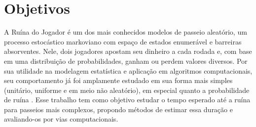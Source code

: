\documentclass[a4paper,10pt,twocolumn]{article}
\begin{document}
\pagestyle{fancy}
\fancyhead{}
\renewcommand{\headrulewidth}{0pt}


\section{Objetivos}

A Ruína do Jogador é um dos mais conhecidos modelos de passeio aleatório, um
processo estocástico markoviano com espaço de estados enumerável e barreiras
absorventes. Nele, dois jogadores apostam seu dinheiro a cada rodada e, com base
em uma distribuição de probabilidades, ganham ou perdem valores diversos. Por sua
utilidade na modelagem  estatística e aplicação em algoritmos computacionais,
seu comportamento já foi amplamente estudado em sua forma mais simples
(unitário, uniforme e em meio não aleatório), em especial quanto a probabilidade
de ruína \cite{ross_introduction_2019}. Esse trabalho tem como objetivo estudar
o tempo esperado até a ruína para passeios mais complexos, propondo métodos de
estimar essa duração e avaliando-os por vias computacionais.
\end{document}
